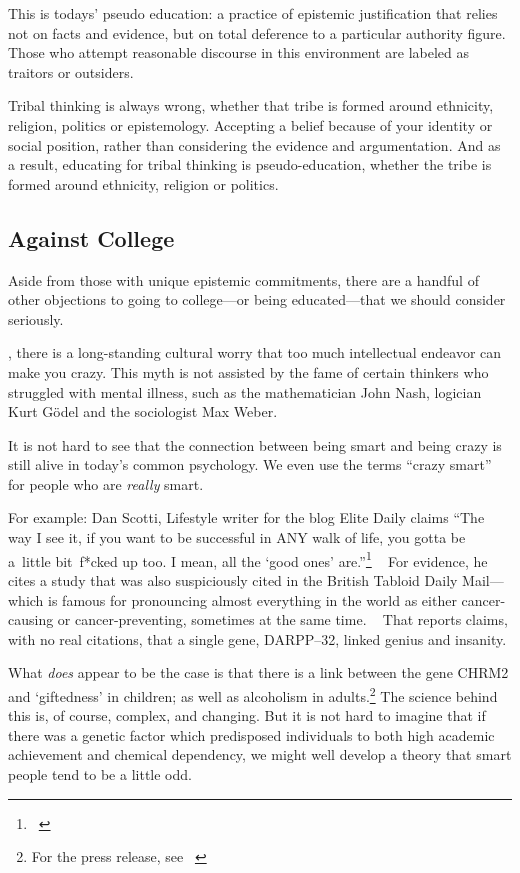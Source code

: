 This is todays' pseudo education: a practice of epistemic justification that relies not on facts and evidence, but on total deference to a particular authority figure. Those who attempt reasonable discourse in this environment are labeled as traitors or outsiders. 

Tribal thinking is always wrong, whether that tribe is formed around ethnicity, religion, politics or epistemology. Accepting a belief because of your identity or social position, rather than considering the evidence and argumentation. And as a result, educating for tribal thinking is pseudo-education, whether the tribe is formed around ethnicity, religion or politics.

\subsection{Against College}
\label{againstcollege}

Aside from those with unique epistemic commitments, there are a handful of other objections to going to college---or being educated---that we should consider seriously.

, there is a long-standing cultural worry that too much intellectual endeavor can make you crazy. This myth is not assisted by the fame of certain thinkers who struggled with mental illness, such as the mathematician John Nash, logician Kurt Gödel and the sociologist Max Weber. 

It is not hard to see that the connection between being smart and being crazy is still alive in today's common psychology. We even use the terms ``crazy smart'' for people who are \emph{really} smart.

For example: Dan Scotti, Lifestyle writer for the blog Elite Daily claims ``The way I see it, if you want to be successful in ANY walk of life, you gotta be a little bit f*cked up too. I mean, all the `good ones' are.''\footnote{~\citep{Scotti:2015uh}} ~\citep{Scotti:2015uh} For evidence, he cites a study that was also suspiciously cited in the British Tabloid Daily Mail---which is famous for pronouncing almost everything in the world as either cancer-causing or cancer-preventing, sometimes at the same time. ~\citep{Waugh:2012ww} That reports claims, with no real citations, that a single gene, DARPP--32, linked genius and insanity.

What \emph{does} appear to be the case is that there is a link between the gene CHRM2 and `giftedness' in children; as well as alcoholism in adults.\footnote{For the press release, see ~\citep{Dryden:2007vu}} The science behind this is, of course, complex, and changing. But it is not hard to imagine that if there was a genetic factor which predisposed individuals to both high academic achievement and chemical dependency, we might well develop a theory that smart people tend to be a little odd.

